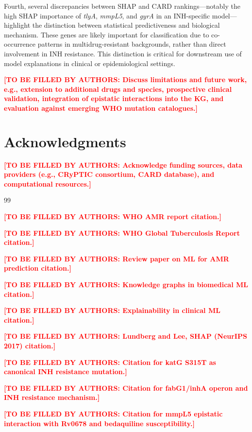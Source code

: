 \documentclass[conference]{IEEEtran}
\newcommand{\tbd}[1]{\textcolor{red}{\textbf{[TO BE FILLED BY AUTHORS: #1]}}}
\begin{document}
Fourth, several discrepancies between SHAP and CARD rankings---notably the high SHAP importance of \textit{tlyA}, \textit{mmpL5}, and \textit{gyrA} in an INH-specific model---highlight the distinction between statistical predictiveness and biological mechanism. These genes are likely important for classification due to co-occurrence patterns in multidrug-resistant backgrounds, rather than direct involvement in INH resistance. This distinction is critical for downstream use of model explanations in clinical or epidemiological settings.

\tbd{Discuss limitations and future work, e.g., extension to additional drugs and species, prospective clinical validation, integration of epistatic interactions into the KG, and evaluation against emerging WHO mutation catalogues.}

\section*{Acknowledgments}
\tbd{Acknowledge funding sources, data providers (e.g., CRyPTIC consortium, CARD database), and computational resources.}

\begin{thebibliography}{99}

\tbd{WHO AMR report citation.}

\tbd{WHO Global Tuberculosis Report citation.}

\tbd{Review paper on ML for AMR prediction citation.}

\tbd{Knowledge graphs in biomedical ML citation.}

\tbd{Explainability in clinical ML citation.}

\tbd{Lundberg and Lee, SHAP (NeurIPS 2017) citation.}

\tbd{Citation for katG S315T as canonical INH resistance mutation.}

\tbd{Citation for fabG1/inhA operon and INH resistance mechanism.}

\tbd{Citation for mmpL5 epistatic interaction with Rv0678 and bedaquiline susceptibility.}

\end{thebibliography}
\end{document}
